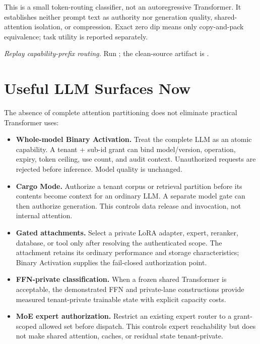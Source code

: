 \documentclass[11pt]{article}
\begin{document}
This is a small token-routing classifier, not an autoregressive Transformer.
It establishes neither prompt text as authority nor generation quality,
shared-attention isolation, or compression. Exact zero dip means only
copy-and-pack equivalence; task utility is reported separately.

\begin{sloppypar}
\noindent\textit{Replay capability-prefix routing.} Run
; the clean-source artifact is
.
\end{sloppypar}

\section{Useful LLM Surfaces Now}

The absence of complete attention partitioning does not eliminate practical
Transformer uses:
\begin{itemize}
  \item \textbf{Whole-model Binary Activation.} Treat the complete LLM as an
  atomic capability. A tenant + sub-id grant can bind model/version, operation,
  expiry, token ceiling, use count, and audit context. Unauthorized requests
  are rejected before inference. Model quality is unchanged.
  \item \textbf{Cargo Mode.} Authorize a tenant corpus or retrieval partition
  before its contents become context for an ordinary LLM. A separate model gate
  can then authorize generation. This controls data release and invocation,
  not internal attention.
  \item \textbf{Gated attachments.} Select a private LoRA adapter, expert,
  reranker, database, or tool only after resolving the authenticated scope. The
  attachment retains its ordinary performance and storage characteristics;
  Binary Activation supplies the fail-closed authorization point.
  \item \textbf{FFN-private classification.} When a frozen shared Transformer
  is acceptable, the demonstrated FFN and private-lane constructions provide
  measured tenant-private trainable state with explicit capacity costs.
  \item \textbf{MoE expert authorization.} Restrict an existing expert router
  to a grant-scoped allowed set before dispatch. This controls expert
  reachability but does not make shared attention, caches, or residual state
  tenant-private.
\end{itemize}
\end{document}
